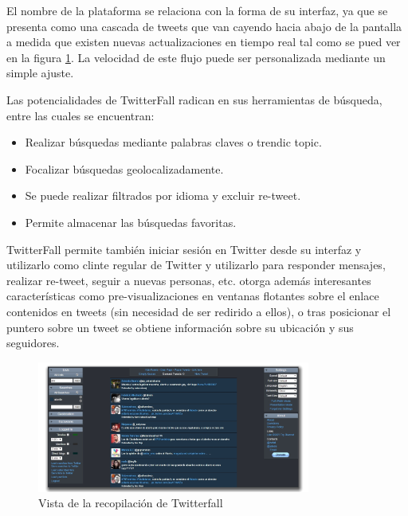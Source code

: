 El nombre de la plataforma se relaciona con la forma de su interfaz, ya que se presenta como una cascada de tweets que van cayendo hacia abajo de la pantalla a medida que existen nuevas actualizaciones en tiempo real tal como se pued ver en la figura \ref{fig:twitterfall}. La velocidad de este flujo puede ser personalizada mediante un simple ajuste.

Las potencialidades de TwitterFall radican en sus herramientas de búsqueda, entre las cuales se encuentran:
\begin{itemize}
	\item Realizar búsquedas mediante palabras claves o trendic topic.
	\item Focalizar búsquedas geolocalizadamente.
	\item Se puede realizar filtrados por idioma y excluir re-tweet.
	\item Permite almacenar las búsquedas favoritas.
\end{itemize}

TwitterFall permite también iniciar sesión en Twitter desde su interfaz y utilizarlo como clinte regular de Twitter y utilizarlo para responder mensajes, realizar re-tweet, seguir a nuevas personas, etc. otorga además interesantes características como pre-visualizaciones en ventanas flotantes sobre el enlace contenidos en tweets (sin necesidad de ser redirido a ellos), o  tras posicionar el puntero sobre un tweet se obtiene información sobre su ubicación y sus seguidores.


\begin{figure}[H]
	\centering
	\includegraphics[width=0.8\textwidth]{imgs/twitterfall.jpg}
	\caption{Vista de la recopilación de Twitterfall}
	\label{fig:twitterfall}
\end{figure}

